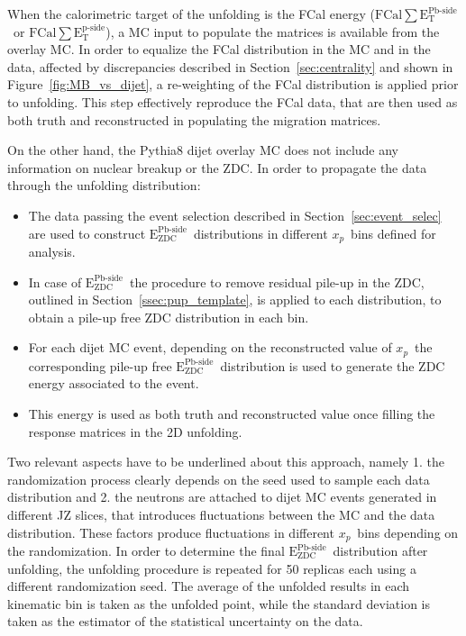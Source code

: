 \documentclass[NOTE, atlasdraft=true, texlive=2020, UKenglish]{atlasdoc}
\newcommand{\EZDC}{$\text{E}_\text{ZDC}^\text{Pb-side}$}
\newcommand{\ETPB}{$\text{FCal} \sum \text{E}_{\text{T}}^{\text{Pb-side} }$}
\newcommand{\ETP}{$\text{FCal} \sum \text{E}_{\text{T}}^{\text{p-side} }$}
\newcommand{\xp}{$x_{p}$}
\begin{document}
When the calorimetric target of the unfolding is the FCal energy (\ETPB\ or \ETP), a MC input to populate the matrices is available from the overlay MC. In order to equalize the FCal distribution in the MC and in the data, affected by discrepancies described in Section~\ref{sec:centrality} and shown in Figure~\ref{fig:MB_vs_dijet}, a re-weighting of the FCal distribution is applied prior to unfolding. This step effectively reproduce the  FCal data, that are then used as both truth and reconstructed in populating the migration matrices. 

On the other hand, the Pythia8 dijet overlay MC does not include any information on nuclear breakup or the ZDC. In order to propagate the data through the unfolding distribution: 
\begin{itemize}
    \item The data passing the event selection described in Section~\ref{sec:event_selec} are used to construct \EZDC\ distributions in different \xp\ bins defined for analysis. 
    \item In case of \EZDC\, the procedure to remove residual pile-up in the ZDC, outlined in Section~\ref{ssec:pup_template}, is applied to each distribution, to obtain a pile-up free ZDC distribution in each bin. 
    \item For each dijet MC event, depending on the reconstructed value of \xp\, the corresponding pile-up free \EZDC\ distribution is used to generate the ZDC energy associated to the event. 
    \item This energy is used as both truth and reconstructed value once filling the response matrices in the 2D unfolding. 
\end{itemize}
Two relevant aspects have to be underlined about this approach, namely 1. the randomization process clearly depends on the seed used to sample each data distribution and 2. the neutrons are attached to dijet MC events generated in different JZ slices, that introduces fluctuations between the MC and the data distribution. These factors produce fluctuations in different \xp\ bins depending on the randomization. In order to determine the final \EZDC\ distribution after unfolding, the unfolding procedure is repeated for 50 replicas each using a different randomization seed. The average of the unfolded results in each kinematic bin is taken as the unfolded point, while the standard deviation is taken as the estimator of the statistical uncertainty on the data. 
\end{document}
